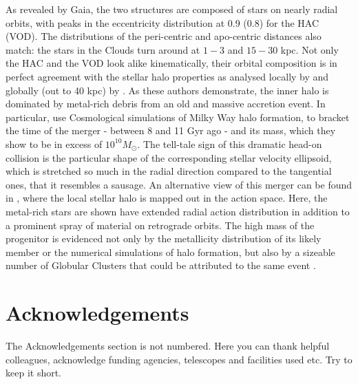 \documentclass[fleqn,usenatbib]{mnras}
\begin{document}
As revealed by Gaia, the two structures are composed of stars on
nearly radial orbits, with peaks in the eccentricity distribution at
0.9 (0.8) for the HAC (VOD). The distributions of the peri-centric and
apo-centric distances also match: the stars in the Clouds turn around
at $1-3$ and $15-30$ kpc. Not only the HAC and the VOD look alike
kinematically, their orbital composition is in perfect agreement with
the stellar halo properties as analysed locally by
\citet{Belokurov2018} and globally (out to 40 kpc) by
\citet{Deason2018pileup}. As these authors demonstrate, the inner halo
is dominated by metal-rich debris from an old and massive accretion
event. In particular, \citet{Belokurov2018} use Cosmological
simulations of Milky Way halo formation, to bracket the time of the
merger - between 8 and 11 Gyr ago - and its mass, which they show to
be in excess of $10^{10} M_{\odot}$. The tell-tale sign of this
dramatic head-on collision is the particular shape of the
corresponding stellar velocity ellipsoid, which is stretched so much
in the radial direction compared to the tangential ones, that it
resembles a sausage. An alternative view of this merger can be found
in \citet{actionhalo}, where the local stellar halo is mapped out in
the action space. Here, the metal-rich stars are shown have extended
radial action distribution in addition to a prominent spray of
material on retrograde orbits. The high mass of the progenitor is
evidenced not only by the metallicity distribution of its likely
member or the numerical simulations of halo formation, but also by a
sizeable number of Globular Clusters that could be attributed to the
same event \citep[see][]{sausagegc}.


\section*{Acknowledgements}

The Acknowledgements section is not numbered. Here you can thank helpful
colleagues, acknowledge funding agencies, telescopes and facilities used etc.
Try to keep it short.




\bsp	%
\label{lastpage}
\end{document}
